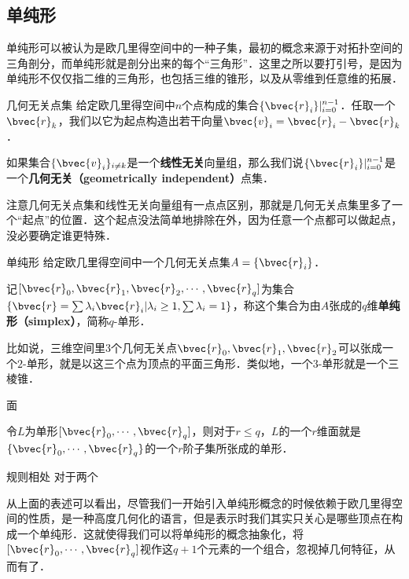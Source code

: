 
\subsection{单纯形}

单纯形可以被认为是欧几里得空间中的一种子集，最初的概念来源于对拓扑空间的三角剖分，而单纯形就是剖分出来的每个“三角形”．这里之所以要打引号，是因为单纯形不仅仅指二维的三角形，也包括三维的锥形，以及从零维到任意维的拓展．

\begin{definition}{几何无关点集}
给定欧几里得空间中$n$个点构成的集合$\{\bvec{r}_i\}|_{i=0}^{n-1}$．任取一个$\bvec{r}_k$，我们以它为起点构造出若干向量$\bvec{v}_i=\bvec{r}_i-\bvec{r}_k$．

如果集合$\{\bvec{v}_i\}_{i\not= k}$是一个\textbf{线性无关}向量组，那么我们说$\{\bvec{r}_i\}|_{i=0}^{n-1}$是一个\textbf{几何无关（geometrically independent）}点集．
\end{definition}

注意几何无关点集和线性无关向量组有一点点区别，那就是几何无关点集里多了一个“起点”的位置．这个起点没法简单地排除在外，因为任意一个点都可以做起点，没必要确定谁更特殊．

\begin{definition}{单纯形}
给定欧几里得空间中一个几何无关点集$A=\{\bvec{r}_i\}$．

记$[\bvec{r}_0, \bvec{r}_1, \bvec{r}_2, \cdots, \bvec{r}_q]$为集合$\{\bvec{r}=\sum\lambda_i\bvec{r}_i|\lambda_i\geq 1, \sum\lambda_i=1\}$，称这个集合为由$A$张成的$q$维\textbf{单纯形（simplex）}，简称$q$-单形．

\end{definition}

比如说，三维空间里$3$个几何无关点$\bvec{r}_0, \bvec{r}_1, \bvec{r}_2$可以张成一个$2$-单形，就是以这三个点为顶点的平面三角形．类似地，一个$3$-单形就是一个三棱锥．

\begin{definition}{面}

令$L$为单形$[\bvec{r}_0, \cdots, \bvec{r}_q]$，则对于$r\leq q$，$L$的一个$r$维面就是$\{\bvec{r}_0, \cdots, \bvec{r}_q\}$的一个$r$阶子集所张成的单形．

\end{definition}


\begin{definition}{规则相处}
对于两个
\end{definition}


从上面的表述可以看出，尽管我们一开始引入单纯形概念的时候依赖于欧几里得空间的性质，是一种高度几何化的语言，但是表示时我们其实只关心是哪些顶点在构成一个单纯形．这就使得我们可以将单纯形的概念抽象化，将$[\bvec{r}_0, \cdots, \bvec{r}_q]$视作这$q+1$个元素的一个组合，忽视掉几何特征，从而有了．










